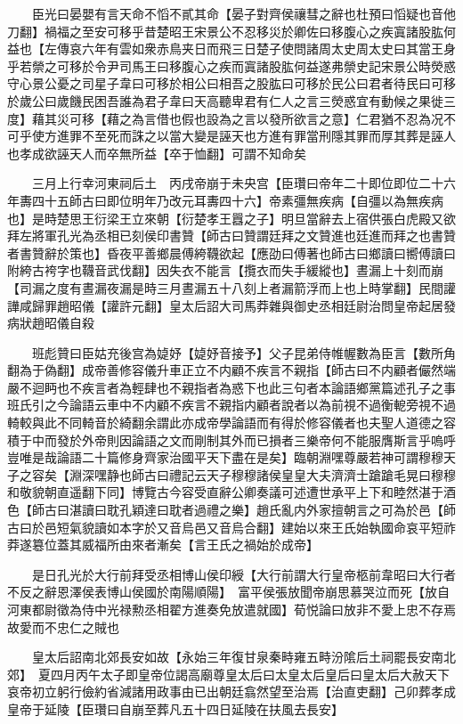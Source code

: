　　臣光曰晏嬰有言天命不慆不貳其命【晏子對齊侯禳彗之辭也杜預曰慆疑也音他刀翻】禍福之至安可移乎昔楚昭王宋景公不忍移災於卿佐曰移腹心之疾寘諸股肱何益也【左傳哀六年有雲如衆赤鳥夹日而飛三日楚子使問諸周太史周太史曰其當王身乎若禜之可移於令尹司馬王曰移腹心之疾而寘諸股肱何益遂弗禜史記宋景公時熒惑守心景公憂之司星子韋曰可移於相公曰相吾之股肱曰可移於民公曰君者待民曰可移於歲公曰歲饑民困吾誰為君子韋曰天高聽卑君有仁人之言三熒惑宜有動候之果徙三度】藉其災可移【藉之為言借也假也設為之言以發所欲言之意】仁君猶不忍為况不可乎使方進罪不至死而誅之以當大變是誣天也方進有罪當刑隱其罪而厚其葬是誣人也孝成欲誣天人而卒無所益【卒于恤翻】可謂不知命矣

　　三月上行幸河東祠后土　丙戌帝崩于未央宫【臣瓚曰帝年二十即位即位二十六年夀四十五師古曰即位明年乃改元耳夀四十六】帝素彊無疾病【自彊以為無疾病也】是時楚思王衍梁王立來朝【衍楚孝王囂之子】明旦當辭去上宿供張白虎殿又欲拜左將軍孔光為丞相已刻侯印書贊【師古曰贊謂廷拜之文贊進也廷進而拜之也書贊者書贊辭於策也】昏夜平善鄉晨傅絝韈欲起【應劭曰傅著也師古曰鄉讀曰嚮傅讀曰附絝古袴字也韈音武伐翻】因失衣不能言【攬衣而失手緩縱也】晝漏上十刻而崩【司漏之度有晝漏夜漏是時三月晝漏五十八刻上者漏箭浮而上也上時掌翻】民間讙譁咸歸罪趙昭儀【讙許元翻】皇太后詔大司馬莽雜與御史丞相廷尉治問皇帝起居發病狀趙昭儀自殺

　　班彪贊曰臣姑充後宫為媫妤【媫妤音接予】父子昆弟侍帷幄數為臣言【數所角翻為于偽翻】成帝善修容儀升車正立不内顧不疾言不親指【師古曰不内顧者儼然端嚴不迴眄也不疾言者為輕肆也不親指者為惑下也此三句者本論語鄉黨篇述孔子之事班氏引之今論語云車中不内顧不疾言不親指内顧者說者以為前視不過衡軶旁視不過輢較與此不同輢音於綺翻余謂此亦成帝學論語而有得於修容儀者也夫聖人道德之容積于中而發於外帝則因論語之文而剛制其外而已損者三樂帝何不能服膺斯言乎嗚呼豈唯是哉論語二十篇修身齊家治國平天下盡在是矣】臨朝淵嘿尊嚴若神可謂穆穆天子之容矣【淵深嘿静也師古曰禮記云天子穆穆諸侯皇皇大夫濟濟士蹌蹌毛晃曰穆穆和敬貌朝直遥翻下同】博覽古今容受直辭公卿奏議可述遭世承平上下和睦然湛于酒色【師古曰湛讀曰耽孔穎達曰耽者過禮之樂】趙氏亂内外家擅朝言之可為於邑【師古曰於邑短氣貌讀如本字於又音烏邑又音烏合翻】建始以來王氏始執國命哀平短祚莽遂簒位蓋其威福所由來者漸矣【言王氏之禍始於成帝】

　　是日孔光於大行前拜受丞相博山侯印綬【大行前謂大行皇帝柩前韋昭曰大行者不反之辭恩澤侯表博山侯國於南陽順陽】　富平侯張放聞帝崩思慕哭泣而死【放自河東都尉徵為侍中光禄勲丞相翟方進奏免放遣就國】荀悦論曰放非不愛上忠不存焉故愛而不忠仁之賊也

　　皇太后詔南北郊長安如故【永始三年復甘泉秦畤雍五畤汾隂后土祠罷長安南北郊】　夏四月丙午太子即皇帝位謁高廟尊皇太后曰太皇太后皇后曰皇太后大赦天下哀帝初立躬行儉約省減諸用政事由已出朝廷翕然望至治焉【治直吏翻】己卯葬孝成皇帝于延陵【臣瓚曰自崩至葬凡五十四日延陵在扶風去長安】

